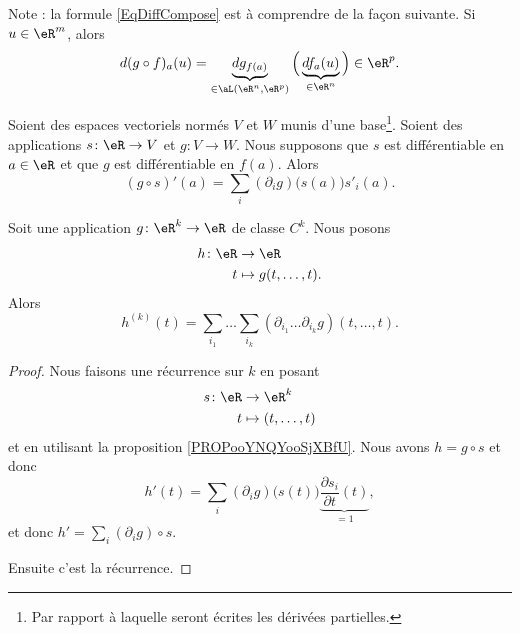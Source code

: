 \begin{remark}
	Note : la formule \eqref{EqDiffCompose} est à comprendre de la façon suivante. Si \( u\in\eR^m\), alors
	\begin{equation}
		d(g\circ f)_a(u)=\underbrace{dg_{f(a)}}_{\in\aL(\eR^n,\eR^p)}\Big( \underbrace{df_a(u)}_{\in\eR^n} \Big)\in\eR^p.
	\end{equation}
\end{remark}

\begin{proposition}	\label{PROPooYNQYooSjXBfU}
	Soient des espaces vectoriels normés \( V\) et \( W\) munis d'une base\footnote{Par rapport à laquelle seront écrites les dérivées partielles.}. Soient des applications \(s \colon \eR\to V  \) et \(g \colon V\to W  \). Nous supposons que \( s\) est différentiable en \( a\in \eR\) et que \( g\) est différentiable en \( f(a)\). Alors
	\begin{equation}
		(g\circ s)'(a)=\sum_i(\partial_ig)\big( s(a) \big)s'_i(a).
	\end{equation}
\end{proposition}

\begin{proposition}	\label{PROPooXAGQooRLMshw}
	Soit une application \(g \colon \eR^k\to \eR  \) de classe \( C^k\). Nous posons
	\begin{equation}
		\begin{aligned}
			h\colon \eR & \to \eR                \\
			t           & \mapsto g(t,\ldots,t).
		\end{aligned}
	\end{equation}
	Alors
	\begin{equation}
		h^{(k)}(t)=\sum_{i_1}\ldots \sum_{i_k}(\partial_{i_1}\ldots \partial_{i_k}g)(t,\ldots,t).
	\end{equation}
\end{proposition}

\begin{proof}
	Nous faisons une récurrence sur \( k\) en posant
	\begin{equation}
		\begin{aligned}
			s\colon \eR & \to \eR^k            \\
			t           & \mapsto (t,\ldots,t)
		\end{aligned}
	\end{equation}
	et en utilisant la proposition \ref{PROPooYNQYooSjXBfU}. Nous avons \( h=g\circ s\) et donc
	\begin{equation}
		h'(t)=\sum_i(\partial_ig)\big( s(t) \big)\underbrace{\frac{ \partial s_i }{ \partial t }(t)}_{=1},
	\end{equation}
	et donc \( h'=\sum_i(\partial_ig)\circ s\).

	Ensuite c'est la récurrence.
\end{proof}

